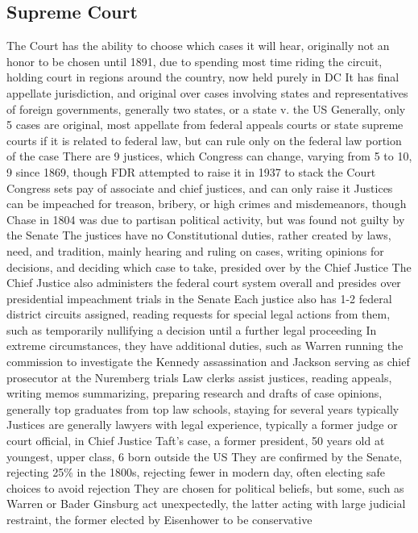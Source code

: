 \documentclass[11 pt, twoside]{article}
\newenvironment{outline*}
{
	\begin{outline}[enumerate]
	}
	{\end{outline}
}
\begin{document}
\subsection{Supreme Court}
\begin{outline*}
\1 The Court has the ability to choose which cases it will hear, originally not an honor to be chosen until 1891, due to spending most time riding the circuit, holding court in regions around the country, now held purely in DC
\1 It has final appellate jurisdiction, and original over cases involving states and representatives of foreign governments, generally two states, or a state v. the US
\2 Generally, only 5 cases are original, most appellate from federal appeals courts or state supreme courts if it is related to federal law, but can rule only on the federal law portion of the case
\1 There are 9 justices, which Congress can change, varying from 5 to 10, 9 since 1869, though FDR attempted to raise it in 1937 to stack the Court
\2 Congress sets pay of associate and chief justices, and can only raise it
\2 Justices can be impeached for treason, bribery, or high crimes and misdemeanors, though Chase in 1804 was due to partisan political activity, but was found not guilty by the Senate
\1 The justices have no Constitutional duties, rather created by laws, need, and tradition, mainly hearing and ruling on cases, writing opinions for decisions, and deciding which case to take, presided over by the Chief Justice
\2 The Chief Justice also administers the federal court system overall and presides over presidential impeachment trials in the Senate
\2 Each justice also has 1-2 federal district circuits assigned, reading requests for special legal actions from them, such as temporarily nullifying a decision until a further legal proceeding
\2 In extreme circumstances, they have additional duties, such as Warren running the commission to investigate the Kennedy assassination and Jackson serving as chief prosecutor at the Nuremberg trials
\1 Law clerks assist justices, reading appeals, writing memos summarizing, preparing research and drafts of case opinions, generally top graduates from top law schools, staying for several years typically
\1 Justices are generally lawyers with legal experience, typically a former judge or court official, in Chief Justice Taft’s case, a former president, 50 years old at youngest, upper class, 6 born outside the US
\1 They are confirmed by the Senate, rejecting 25\% in the 1800s, rejecting fewer in modern day, often electing safe choices to avoid rejection
\2 They are chosen for political beliefs, but some, such as Warren or Bader Ginsburg act unexpectedly, the latter acting with large judicial restraint, the former elected by Eisenhower to be conservative

\end{outline*}
\end{document}
